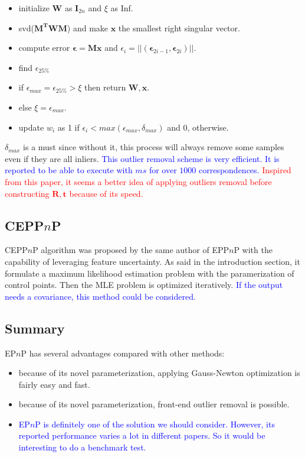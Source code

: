 \documentclass[a4paper]{article}
\begin{document}
\begin{itemize}
	\item initialize $\mathbf{W}$ as $\mathbf{I}_{2n}$ and $\xi$ as Inf.
	\item svd($\mathbf{M^TWM}$) and make $\mathbf{x}$ the smallest right singular vector.
	\item compute error $\mathbf{\epsilon}=\mathbf{Mx}$ and $\epsilon_i=||(\mathbf{\epsilon}_{2i-1}, \mathbf{\epsilon}_{2i})||$.
	\item find $\epsilon_{25\%}$
	\item if $\epsilon_{max}=\epsilon_{25\%}>\xi$ then return $\mathbf{W,x}$.
	\item else $\xi=\epsilon_{max}$.
	\item update $w_i$ as 1 if $\epsilon_i < max(\epsilon_{max}, \delta_{max})$ and 0, otherwise.
\end{itemize}
$\delta_{max}$ is a must since without it, this process will always remove some samples even if they are all inliers. \textcolor{blue}{This outlier removal scheme is very efficient. It is reported to be able to execute with $ms$ for over $1000$ correspondences.} \textcolor{red}{Inspired from this paper, it seems a better idea of applying outliers removal before constructing $\mathbf{R,t}$ because of its speed.}

\subsection{CEPP$n$P}
CEPP$n$P algorithm was proposed by the same author of EPP$n$P with the capability of leveraging feature uncertainty. As said in the introduction section, it formulate a maximum likelihood estimation problem with the paramerization of control points. Then the MLE problem is optimized iteratively. \textcolor{blue}{If the output needs a covariance, this method could be considered.}

\subsection{Summary}
EP$n$P has several advantages compared with other methods:
\begin{itemize}
	\item because of its novel parameterization, applying Gauss-Newton optimization is fairly easy and fast.
	\item because of its novel parameterization, front-end outlier removal is possible.
	\item \textcolor{blue}{EP$n$P is definitely one of the solution we should consider. However, its reported performance varies a lot in different papers. So it would be interesting to do a benchmark test.}
\end{itemize}
\end{document}
